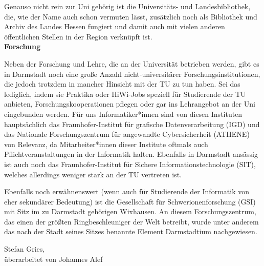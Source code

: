 {    Genauso nicht rein zur Uni gehörig ist die Universitäts- und Landesbibliothek, die, wie der Name auch schon vermuten lässt, zusätzlich noch als Bibliothek und Archiv des Landes Hessen fungiert und damit auch mit vielen anderen öffentlichen Stellen in der Region verknüpft ist.\\

    \textbf{Forschung}

    Neben der Forschung und Lehre, die an der Universität betrieben werden, gibt es in Darmstadt noch eine große Anzahl nicht-universitärer Forschungsinstitutionen, die jedoch trotzdem in mancher Hinsicht mit der TU zu tun haben. Sei das lediglich, indem sie Praktika oder HiWi-Jobs speziell für Studierende der TU anbieten, Forschungskooperationen pflegen oder gar ins Lehrangebot an der Uni eingebunden werden.
    Für uns Informatiker*innen sind von diesen Instituten hauptsächlich das Fraunhofer-Institut für grafische Datenverarbeitung (IGD) und das Nationale Forschungszentrum für angewandte Cybersicherheit (ATHENE) von Relevanz, da Mitarbeiter*innen dieser Institute oftmals auch Pflichtveranstaltungen in der Informatik halten. Ebenfalls in Darmstadt ansässig ist auch noch das Fraunhofer-Institut für Sichere Informationstechnologie (SIT), welches allerdings weniger stark an der TU vertreten ist.

    Ebenfalls noch erwähnenswert (wenn auch für Studierende der Informatik von eher sekundärer Bedeutung) ist die Gesellschaft für Schwerionenforschung (GSI) mit Sitz im zu Darmstadt gehörigen Wixhausen. An diesem Forschungszentrum, das einen der größten Ringbeschleuniger der Welt betreibt, wurde unter anderem das nach der Stadt seines Sitzes benannte Element Darmstadtium nachgewiesen.}
{Stefan Gries, \\überarbeitet von Johannes Alef}
\newpage
